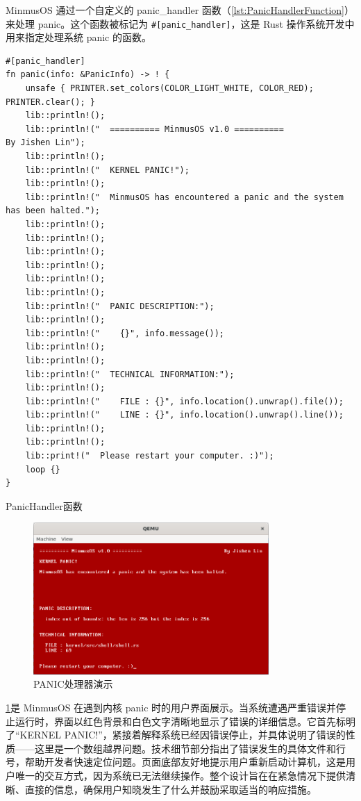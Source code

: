 MinmusOS 通过一个自定义的 panic\_handler 函数（\cref{lst:PanicHandlerFunction}）来处理 panic。这个函数被标记为 \texttt{\#[panic\_handler]}，这是 Rust 操作系统开发中用来指定处理系统 panic 的函数。

\begin{listing}[htbp]
    \begin{verbatim}
#[panic_handler]
fn panic(info: &PanicInfo) -> ! {
    unsafe { PRINTER.set_colors(COLOR_LIGHT_WHITE, COLOR_RED); PRINTER.clear(); }
    lib::println!();
    lib::println!("  ========== MinmusOS v1.0 ==========                            By Jishen Lin");
    lib::println!();
    lib::println!("  KERNEL PANIC!");
    lib::println!();
    lib::println!("  MinmusOS has encountered a panic and the system has been halted.");
    lib::println!();
    lib::println!();
    lib::println!();
    lib::println!();
    lib::println!();
    lib::println!();
    lib::println!("  PANIC DESCRIPTION:");
    lib::println!();
    lib::println!("    {}", info.message());
    lib::println!();
    lib::println!();
    lib::println!("  TECHNICAL INFORMATION:");
    lib::println!();
    lib::println!("    FILE : {}", info.location().unwrap().file());
    lib::println!("    LINE : {}", info.location().unwrap().line());
    lib::println!();
    lib::println!();
    lib::print!("  Please restart your computer. :)");
    loop {}
}
    \end{verbatim}
    \caption{PanicHandler函数}\label{lst:PanicHandlerFunction}
\end{listing}

\begin{figure}[htbp]
    \centering
    \includegraphics[width=0.8\textwidth]{figures/PanicHandlerPresentation.png}
    \caption{PANIC处理器演示}
    \label{fig:PanicHandlerPresentation}
\end{figure}

\cref{fig:PanicHandlerPresentation}是 MinmusOS 在遇到内核 panic 时的用户界面展示。当系统遭遇严重错误并停止运行时，界面以红色背景和白色文字清晰地显示了错误的详细信息。它首先标明了“KERNEL PANIC!”，紧接着解释系统已经因错误停止，并具体说明了错误的性质——这里是一个数组越界问题。技术细节部分指出了错误发生的具体文件和行号，帮助开发者快速定位问题。页面底部友好地提示用户重新启动计算机，这是用户唯一的交互方式，因为系统已无法继续操作。整个设计旨在在紧急情况下提供清晰、直接的信息，确保用户知晓发生了什么并鼓励采取适当的响应措施。


